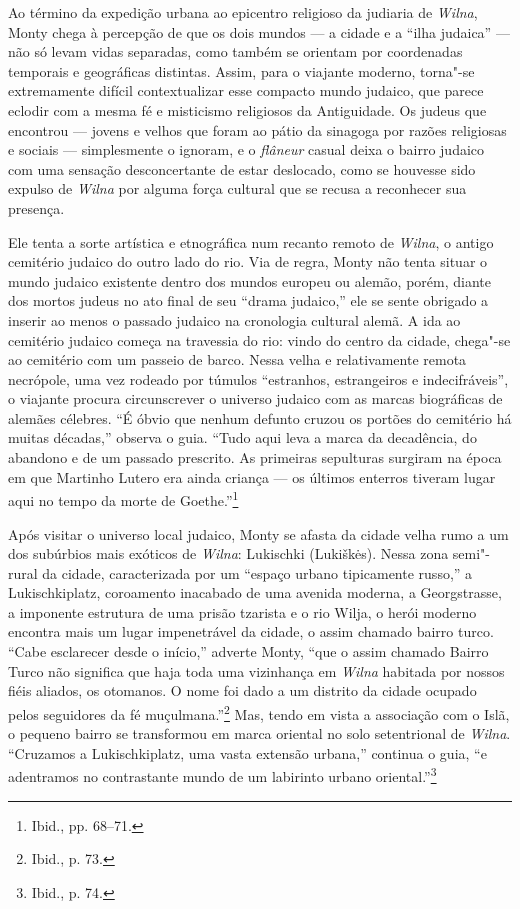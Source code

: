 Ao término da expedição urbana ao epicentro religioso da judiaria de
\textit{Wilna}, Monty chega à percepção de que os dois mundos --- a cidade e a
``ilha judaica'' --- não só levam vidas separadas, como também se orientam
por coordenadas temporais e geográficas distintas. Assim, para o
viajante moderno, torna"-se extremamente difícil contextualizar esse
compacto mundo judaico, que parece eclodir com a mesma fé e misticismo
religiosos da Antiguidade. Os judeus que encontrou --- jovens e velhos que
foram ao pátio da sinagoga por razões religiosas e sociais ---
simplesmente o ignoram, e o \textit{flâneur} casual deixa o bairro judaico
com uma sensação desconcertante de estar deslocado, como se houvesse
sido expulso de \textit{Wilna} por alguma força cultural que se recusa a
reconhecer sua presença.

Ele tenta a sorte artística e etnográfica num recanto remoto de \textit{Wilna}, o
antigo cemitério judaico do outro lado do rio. Via de regra, Monty não
tenta situar o mundo judaico existente dentro dos mundos europeu ou
alemão, porém, diante dos mortos judeus no ato final de seu ``drama
judaico,'' ele se sente obrigado a inserir ao menos o passado judaico na
cronologia cultural alemã. A ida ao cemitério judaico começa na
travessia do rio: vindo do centro da cidade, chega"-se ao cemitério com
um passeio de barco. Nessa velha e relativamente remota necrópole, uma
vez rodeado por túmulos ``estranhos, estrangeiros e indecifráveis'', o
viajante procura circunscrever o universo judaico com as marcas
biográficas de alemães célebres. ``É óbvio que nenhum defunto cruzou os
portões do cemitério há muitas décadas,'' observa o guia. ``Tudo aqui
leva a marca da decadência, do abandono e de um passado prescrito. As
primeiras sepulturas surgiram na época em que Martinho Lutero era ainda
criança --- os últimos enterros tiveram lugar aqui no tempo da morte de
Goethe.''\footnote{Ibid., pp. 68--71.}

%

Após visitar o universo local judaico, Monty se afasta da cidade velha
rumo a um dos subúrbios mais exóticos de \textit{Wilna}: Lukischki (Lukiškės).
Nessa zona semi"-rural da cidade, caracterizada por um ``espaço urbano
tipicamente russo,'' a Lukischkiplatz, coroamento inacabado de uma
avenida moderna, a Georgstrasse, a imponente estrutura de uma prisão
tzarista e o rio Wilja, o herói moderno encontra mais um lugar
impenetrável da cidade, o assim chamado bairro turco. ``Cabe esclarecer
desde o início,'' adverte Monty, ``que o assim chamado Bairro Turco não
significa que haja toda uma vizinhança em \textit{Wilna} habitada por nossos
fiéis aliados, os otomanos. O nome foi dado a um distrito da cidade
ocupado pelos seguidores da fé muçulmana.''\footnote{Ibid., p. 73.} Mas,
tendo em vista a associação com o Islã, o pequeno bairro se transformou
em marca oriental no solo setentrional de \textit{Wilna}. ``Cruzamos a
Lukischkiplatz, uma vasta extensão urbana,'' continua o guia, ``e
adentramos no contrastante mundo de um labirinto urbano
oriental.''\footnote{Ibid., p. 74.}

